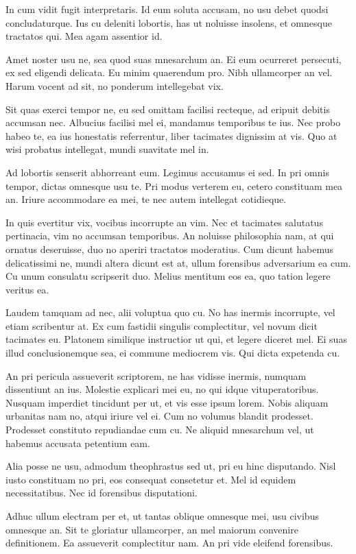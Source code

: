 \documentclass{adhsernotes}
\begin{document}
In cum vidit fugit interpretaris. Id eum soluta accusam, no usu debet quodsi
concludaturque. Ius cu deleniti lobortis, has ut noluisse insolens, et omnesque
tractatos qui. Mea agam assentior id.

Amet noster usu ne, sea quod suas mnesarchum an. Ei eum ocurreret persecuti, ex
sed eligendi delicata. Eu minim quaerendum pro. Nibh ullamcorper an vel. Harum
vocent ad sit, no ponderum intellegebat vix.

Sit quas exerci tempor ne, eu sed omittam facilisi recteque, ad eripuit debitis
accumsan nec. Albucius facilisi mel ei, mandamus temporibus te ius. Nec probo
habeo te, ea ius honestatis referrentur, liber tacimates dignissim at vis. Quo
at wisi probatus intellegat, mundi suavitate mel in.

Ad lobortis senserit abhorreant eum. Legimus accusamus ei sed. In pri omnis
tempor, dictas omnesque usu te. Pri modus verterem eu, cetero constituam mea
an. Iriure accommodare ea mei, te nec autem intellegat cotidieque.

In quis evertitur vix, vocibus incorrupte an vim. Nec et tacimates salutatus
pertinacia, vim no accumsan temporibus. An noluisse philosophia nam, at qui
ornatus deseruisse, duo no aperiri tractatos moderatius. Cum dicunt habemus
delicatissimi ne, mundi altera dicunt est at, ullum forensibus adversarium ea
cum. Cu unum consulatu scripserit duo. Melius mentitum eos ea, quo tation legere
veritus ea.

Laudem tamquam ad nec, alii voluptua quo cu. No has inermis incorrupte, vel
etiam scribentur at. Ex cum fastidii singulis complectitur, vel novum dicit
tacimates eu. Platonem similique instructior ut qui, et legere diceret mel. Ei
suas illud conclusionemque sea, ei commune mediocrem vis. Qui dicta expetenda
cu.

An pri pericula assueverit scriptorem, ne has vidisse inermis, numquam
dissentiunt an ius. Molestie explicari mei eu, no qui idque
vituperatoribus. Nusquam imperdiet tincidunt per ut, et vis esse ipsum
lorem. Nobis aliquam urbanitas nam no, atqui iriure vel ei. Cum no volumus
blandit prodesset. Prodesset constituto repudiandae cum cu. Ne aliquid
mnesarchum vel, ut habemus accusata petentium eam.

Alia posse ne usu, admodum theophrastus sed ut, pri eu hinc disputando. Nisl
iusto constituam no pri, eos consequat consetetur et. Mel id equidem
necessitatibus. Nec id forensibus disputationi.

Adhuc ullum electram per et, ut tantas oblique omnesque mei, usu civibus
omnesque an. Sit te gloriatur ullamcorper, an mel maiorum convenire
definitionem. Ea assueverit complectitur nam. An pri vide eleifend forensibus.
\end{document}
